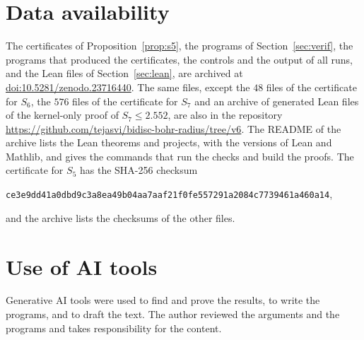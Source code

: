\documentclass[11pt]{amsart}
\theoremstyle{remark}
\numberwithin{equation}{section}
\newcommand{\SUPPDOI}{10.5281/zenodo.23716440}
\newcommand{\REPOURL}{https://github.com/tejasvi/bidisc-bohr-radius/tree/v6}
\newcommand{\SevenOwn}{2.552}
\newcommand{\NFilesSeven}{576}
\begin{document}
\section*{Data availability}
The certificates of Proposition~\ref{prop:s5}, the programs of Section~\ref{sec:verif}, the programs that produced the certificates, the controls and the output of all runs, and the Lean files of Section~\ref{sec:lean}, are archived at \href{https://doi.org/\SUPPDOI}{doi:\SUPPDOI}. The same files, except the $48$ files of the certificate for $S_6$, the $\NFilesSeven$ files of the certificate for $S_7$ and an archive of generated Lean files of the kernel-only proof of $S_7\le\SevenOwn$, are also in the repository \url{\REPOURL}. The README of the archive lists the Lean theorems and projects, with the versions of Lean and Mathlib, and gives the commands that run the checks and build the proofs. The certificate for $S_5$ has the SHA-256 checksum
\begin{center}
\texttt{ce3e9dd41a0dbd9c3a8ea49b04aa7aaf21f0fe557291a2084c7739461a460a14},
\end{center}
and the archive lists the checksums of the other files.

\section*{Use of AI tools}
Generative AI tools were used to find and prove the results, to write the programs, and to draft the text. The author reviewed the arguments and the programs and takes responsibility for the content.
\end{document}

